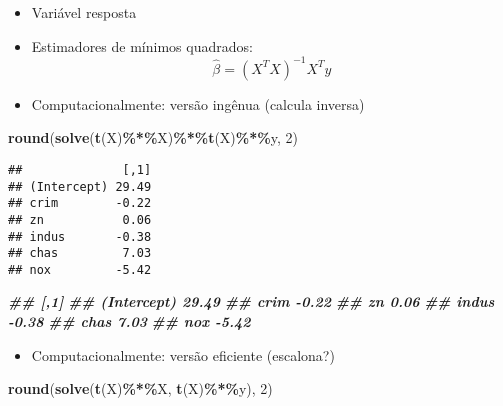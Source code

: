 \documentclass[
]{article}
\newenvironment{Shaded}{\begin{snugshade}}{\end{snugshade}}
\newcommand{\DecValTok}[1]{\textcolor[rgb]{0.00,0.00,0.81}{#1}}
\newcommand{\DocumentationTok}[1]{\textcolor[rgb]{0.56,0.35,0.01}{\textbf{\textit{#1}}}}
\newcommand{\FunctionTok}[1]{\textcolor[rgb]{0.13,0.29,0.53}{\textbf{#1}}}
\newcommand{\NormalTok}[1]{#1}
\newcommand{\OtherTok}[1]{\textcolor[rgb]{0.56,0.35,0.01}{#1}}
\newcommand{\SpecialCharTok}[1]{\textcolor[rgb]{0.81,0.36,0.00}{\textbf{#1}}}
\providecommand{\tightlist}{%
  \setlength{\itemsep}{0pt}\setlength{\parskip}{0pt}}
\begin{document}
\begin{itemize}
\tightlist
\item
  Variável resposta
\end{itemize}

\begin{Shaded}
\end{Shaded}

\begin{itemize}
\tightlist
\item
  Estimadores de mínimos quadrados: \[
  \hat{\beta} = (X^{T}X)^{-1} X^{T}y
  \]
\item
  Computacionalmente: versão ingênua (calcula inversa)
\end{itemize}

\begin{Shaded}
\begin{Highlighting}[]
\FunctionTok{round}\NormalTok{(}\FunctionTok{solve}\NormalTok{(}\FunctionTok{t}\NormalTok{(X)}\SpecialCharTok{\%*\%}\NormalTok{X)}\SpecialCharTok{\%*\%}\FunctionTok{t}\NormalTok{(X)}\SpecialCharTok{\%*\%}\NormalTok{y, }\DecValTok{2}\NormalTok{)}
\end{Highlighting}
\end{Shaded}

\begin{verbatim}
##              [,1]
## (Intercept) 29.49
## crim        -0.22
## zn           0.06
## indus       -0.38
## chas         7.03
## nox         -5.42
\end{verbatim}

\begin{Shaded}
\begin{Highlighting}[]
\DocumentationTok{\#\# [,1]}
\DocumentationTok{\#\# (Intercept) 29.49}
\DocumentationTok{\#\# crim {-}0.22}
\DocumentationTok{\#\# zn 0.06}
\DocumentationTok{\#\# indus {-}0.38}
\DocumentationTok{\#\# chas 7.03}
\DocumentationTok{\#\# nox {-}5.42}
\end{Highlighting}
\end{Shaded}

\begin{itemize}
\tightlist
\item
  Computacionalmente: versão eficiente (escalona?)
\end{itemize}

\begin{Shaded}
\begin{Highlighting}[]
\FunctionTok{round}\NormalTok{(}\FunctionTok{solve}\NormalTok{(}\FunctionTok{t}\NormalTok{(X)}\SpecialCharTok{\%*\%}\NormalTok{X, }\FunctionTok{t}\NormalTok{(X)}\SpecialCharTok{\%*\%}\NormalTok{y), }\DecValTok{2}\NormalTok{)}
\end{Highlighting}
\end{Shaded}
\end{document}
